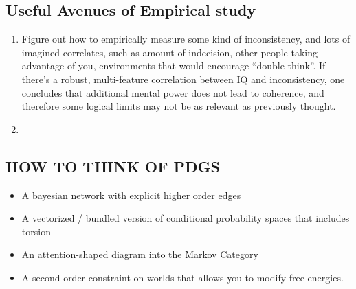 
	
	








\subsection{Useful Avenues of Empirical study}

\begin{enumerate}
	\item Figure out how to empirically measure some kind of inconsistency, and lots of imagined correlates, such as amount of indecision, other people taking advantage of you, environments that would encourage ``double-think''. If there's a robust, multi-feature correlation between IQ and inconsistency, one concludes that additional mental power does not lead to coherence, and therefore some logical limits may not be as relevant as previously thought.
	\item 
\end{enumerate}



\subsection{HOW TO THINK OF PDGS}
\begin{itemize}
	\item A bayesian network with explicit higher order edges
	\item A vectorized / bundled version of conditional probability spaces that includes torsion
	\item An attention-shaped diagram into the Markov Category
	\item A second-order constraint on worlds that allows you to modify free energies.
\end{itemize}
